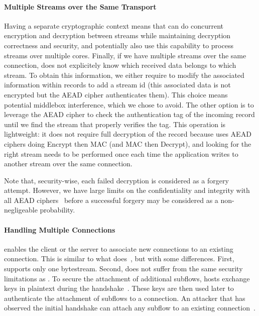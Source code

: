 \paragraph*{Multiple Streams over the Same Transport}
Having a separate cryptographic context means that \tcpls can do concurrent
encryption and decryption between streams while maintaining decryption
correctness and security, and potentially also use this capability to process
streams over multiple cores. Finally, if we have multiple streams over the same
\tcp connection, \tcpls does not explicitely know which received data belongs to
which stream. To obtain this information, we either require to modify the
associated information within \tls records to add a stream id (this associated
data is not encrypted but the AEAD cipher authenticates them). This choice
means potential middlebox interference, which we chose to avoid. The other
option is to leverage the AEAD cipher to check the authentication tag of the
incoming record until we find the stream that properly verifies the tag. This
operation is lightweight: it does not require full decryption of the record
because  uses AEAD ciphers doing Encrypt then MAC (and MAC then
Decrypt), and looking for the right stream needs to be performed once each time
the application writes to another stream over the same \tcp connection.

Note that, security-wise, each failed decryption is considered as a
forgery attempt. However, we have large limits on the confidentiality and
integrity with all AEAD ciphers~\cite{luykx2015limits, aeadlimits} before a
successful forgery may be considered as a non-negligeable probability.

\paragraph*{Handling Multiple \tcp Connections}
\tcpls enables the client or the server to associate new \tcp connections to an existing \tcpls connection. This is similar to what \mptcp does~\cite{raiciu2012hard,rfc6824}, but with some differences. First, \mptcp supports only one bytestream. Second, \tcpls does not suffer from the same security limitations as \mptcp. To secure the attachment of additional subflows, \mptcp hosts exchange keys in plaintext during the handshake~\cite{rfc6824, rfc8684}. These keys are then used later to authenticate the attachment of subflows to a connection. An attacker that has observed the initial handshake can attach any subflow to an existing \mptcp connection~\cite{rfc6181}.


